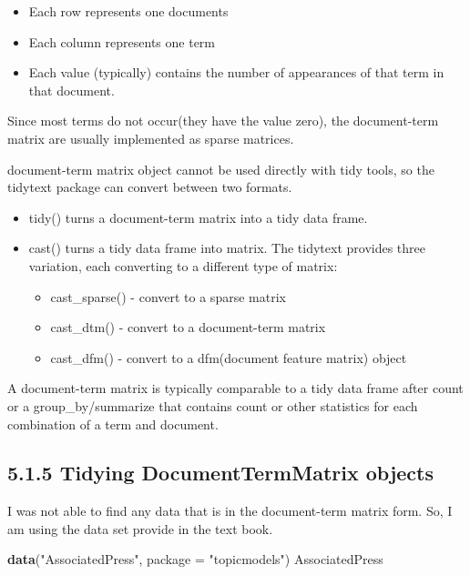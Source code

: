 \documentclass[]{article}
\newenvironment{Shaded}{\begin{snugshade}}{\end{snugshade}}
\newcommand{\DataTypeTok}[1]{\textcolor[rgb]{0.13,0.29,0.53}{#1}}
\newcommand{\KeywordTok}[1]{\textcolor[rgb]{0.13,0.29,0.53}{\textbf{#1}}}
\newcommand{\NormalTok}[1]{#1}
\newcommand{\StringTok}[1]{\textcolor[rgb]{0.31,0.60,0.02}{#1}}
\providecommand{\tightlist}{%
  \setlength{\itemsep}{0pt}\setlength{\parskip}{0pt}}
\begin{document}
\begin{itemize}
\tightlist
\item
  Each row represents one documents
\item
  Each column represents one term
\item
  Each value (typically) contains the number of appearances of that term
  in that document.
\end{itemize}

Since most terms do not occur(they have the value zero), the
document-term matrix are usually implemented as sparse matrices.

document-term matrix object cannot be used directly with tidy tools, so
the tidytext package can convert between two formats.

\begin{itemize}
\tightlist
\item
  tidy() turns a document-term matrix into a tidy data frame.
\item
  cast() turns a tidy data frame into matrix. The tidytext provides
  three variation, each converting to a different type of matrix:

  \begin{itemize}
  \tightlist
  \item
    cast\_sparse() - convert to a sparse matrix
  \item
    cast\_dtm() - convert to a document-term matrix
  \item
    cast\_dfm() - convert to a dfm(document feature matrix) object
  \end{itemize}
\end{itemize}

A document-term matrix is typically comparable to a tidy data frame
after count or a group\_by/summarize that contains count or other
statistics for each combination of a term and document.

\hypertarget{tidying-documenttermmatrix-objects}{%
\subsection{5.1.5 Tidying DocumentTermMatrix
objects}\label{tidying-documenttermmatrix-objects}}

I was not able to find any data that is in the document-term matrix
form. So, I am using the data set provide in the text book.

\begin{Shaded}
\begin{Highlighting}[]
\KeywordTok{data}\NormalTok{(}\StringTok{"AssociatedPress"}\NormalTok{, }\DataTypeTok{package =} \StringTok{"topicmodels"}\NormalTok{)}
\NormalTok{AssociatedPress}
\end{Highlighting}
\end{Shaded}
\end{document}
